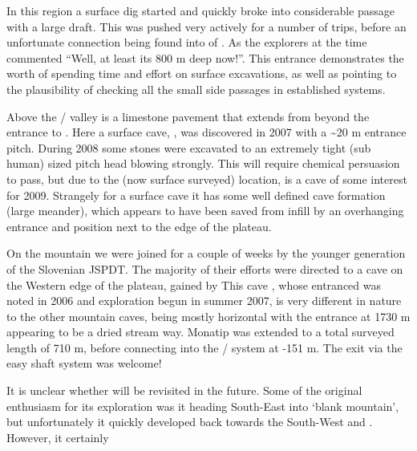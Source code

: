 In this region a surface dig started and quickly broke into considerable
passage with a large draft. This was pushed very actively for a number
of trips, before an unfortunate connection being found into  of . As the explorers at the time commented
``Well, at least its 800 m deep now!''. This  entrance
demonstrates the worth of spending time and effort on surface
excavations, as well as pointing to the plausibility of checking all the
small side passages in established systems.

Above the / valley is a limestone
pavement that extends from beyond the entrance to . Here a
surface cave, , was discovered in 2007 with a \textasciitilde20
m entrance pitch. During 2008 some stones were excavated to an extremely
tight (sub human) sized pitch head blowing strongly. This will require
chemical persuasion to pass, but due to the (now surface surveyed)
location, is a cave of some interest for 2009. Strangely for a surface
cave it has some well defined cave formation (large meander), which
appears to have been saved from infill by an overhanging entrance and
position next to the edge of the plateau.

On the mountain we were joined for a couple of weeks by the younger
generation of the Slovenian JSPDT. The majority of their efforts were
directed to a cave on the Western edge of the plateau, gained by 
This cave , whose entranced was noted in 2006 and exploration
begun in summer 2007, is very different in nature to the other mountain
caves, being mostly horizontal with the entrance at 1730 m appearing to
be a dried stream way. Monatip was extended to a total surveyed length
of 710 m, before connecting into the  / 
system at -151 m. The exit via the easy  shaft system
was welcome!

It is unclear whether  will be revisited in the future.
Some of the original enthusiasm for its exploration was it heading
South-East into `blank mountain', but unfortunately it quickly developed
back towards the South-West and . However, it certainly

